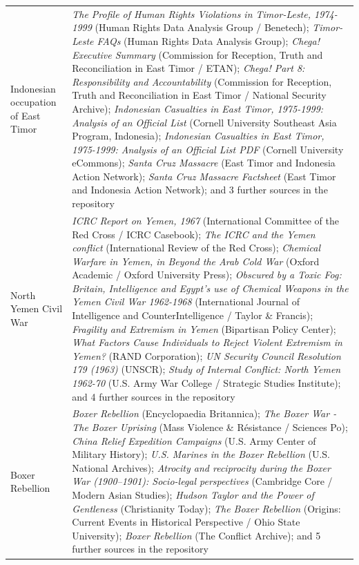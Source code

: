 \documentclass[11pt]{article}
\begin{document}
\begin{scriptsize}
\begin{longtable}{p{3.5cm} p{12.5cm}}
\addlinespace
Indonesian occupation of East Timor & \emph{The Profile of Human Rights Violations in Timor-Leste, 1974-1999} (Human Rights Data Analysis Group / Benetech); \emph{Timor-Leste FAQs} (Human Rights Data Analysis Group); \emph{Chega! Executive Summary} (Commission for Reception, Truth and Reconciliation in East Timor / ETAN); \emph{Chega! Part 8: Responsibility and Accountability} (Commission for Reception, Truth and Reconciliation in East Timor / National Security Archive); \emph{Indonesian Casualties in East Timor, 1975-1999: Analysis of an Official List} (Cornell University Southeast Asia Program, Indonesia); \emph{Indonesian Casualties in East Timor, 1975-1999: Analysis of an Official List PDF} (Cornell University eCommons); \emph{Santa Cruz Massacre} (East Timor and Indonesia Action Network); \emph{Santa Cruz Massacre Factsheet} (East Timor and Indonesia Action Network); and 3 further sources in the repository \\
\addlinespace
North Yemen Civil War & \emph{ICRC Report on Yemen, 1967} (International Committee of the Red Cross / ICRC Casebook); \emph{The ICRC and the Yemen conflict} (International Review of the Red Cross); \emph{Chemical Warfare in Yemen, in Beyond the Arab Cold War} (Oxford Academic / Oxford University Press); \emph{Obscured by a Toxic Fog: Britain, Intelligence and Egypt's use of Chemical Weapons in the Yemen Civil War 1962-1968} (International Journal of Intelligence and CounterIntelligence / Taylor \& Francis); \emph{Fragility and Extremism in Yemen} (Bipartisan Policy Center); \emph{What Factors Cause Individuals to Reject Violent Extremism in Yemen?} (RAND Corporation); \emph{UN Security Council Resolution 179 (1963)} (UNSCR); \emph{Study of Internal Conflict: North Yemen 1962-70} (U.S. Army War College / Strategic Studies Institute); and 4 further sources in the repository \\
\addlinespace
Boxer Rebellion & \emph{Boxer Rebellion} (Encyclopaedia Britannica); \emph{The Boxer War - The Boxer Uprising} (Mass Violence \& Résistance / Sciences Po); \emph{China Relief Expedition Campaigns} (U.S. Army Center of Military History); \emph{U.S. Marines in the Boxer Rebellion} (U.S. National Archives); \emph{Atrocity and reciprocity during the Boxer War (1900–1901): Socio-legal perspectives} (Cambridge Core / Modern Asian Studies); \emph{Hudson Taylor and the Power of Gentleness} (Christianity Today); \emph{The Boxer Rebellion} (Origins: Current Events in Historical Perspective / Ohio State University); \emph{Boxer Rebellion} (The Conflict Archive); and 5 further sources in the repository \\

\end{longtable}
\end{scriptsize}
\end{document}
